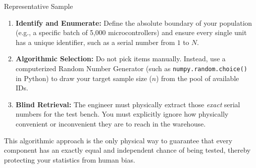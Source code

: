 \begin{frame}[allowframebreaks]{Representative Sample}
{    \begin{recipe}
        \begin{enumerate}
            \item \textbf{Identify and Enumerate:} Define the absolute boundary of your population (e.g., a specific batch of 5,000 microcontrollers) and ensure every single unit has a unique identifier, such as a serial number from $1$ to $N$.
            \item \textbf{Algorithmic Selection:} Do not pick items manually. Instead, use a computerized Random Number Generator (such as \texttt{numpy.random.choice()} in Python) to draw your target sample size ($n$) from the pool of available IDs. 
            \item \textbf{Blind Retrieval:} The engineer must physically extract those \textit{exact} serial numbers for the test bench. You must explicitly ignore how physically convenient or inconvenient they are to reach in the warehouse. 
        \end{enumerate}
    \end{recipe}
    
    This algorithmic approach is the only physical way to guarantee that every component has an exactly equal and independent chance of being tested, thereby protecting your statistics from human bias.
}


\end{frame}
